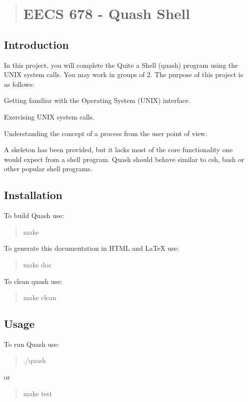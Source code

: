 \begin{quote}
\section*{E\+E\+CS 678 -\/ Quash Shell}

\end{quote}


\subsection*{Introduction}

In this project, you will complete the Quite a Shell (quash) program using the U\+N\+IX system calls. You may work in groups of 2. The purpose of this project is as follows\+:


\begin{DoxyItemize}
\item Getting familiar with the Operating System (U\+N\+IX) interface.
\item Exercising U\+N\+IX system calls.
\item Understanding the concept of a process from the user point of view.
\end{DoxyItemize}

A skeleton has been provided, but it lacks most of the core functionality one would expect from a shell program. Quash should behave similar to csh, bash or other popular shell programs.

\subsection*{Installation}

To build Quash use\+: \begin{quote}
{\ttfamily make} \end{quote}


To generate this documentation in H\+T\+ML and La\+TeX use\+: \begin{quote}
{\ttfamily make doc} \end{quote}


To clean quash use\+: \begin{quote}
{\ttfamily make clean} \end{quote}


\subsection*{Usage}

To run Quash use\+: \begin{quote}
{\ttfamily ./quash} \end{quote}
or \begin{quote}
{\ttfamily make test} \end{quote}


